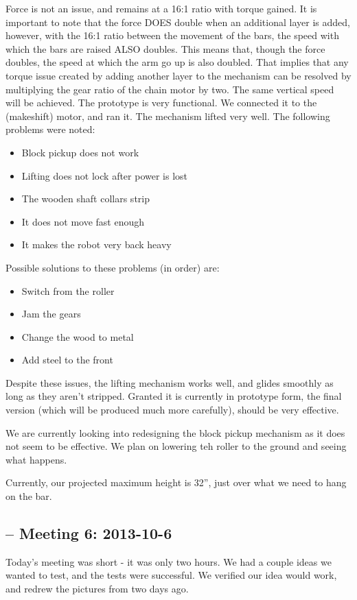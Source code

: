 Force is not an issue, and remains at a 16:1 ratio with torque gained. It is important to note that the force DOES double when an additional layer is added, however, with the 16:1 ratio between the movement of the bars, the speed with which the bars are raised ALSO doubles. This means that, though the force doubles, the speed at which the arm go up is also doubled. That implies that any torque issue created by adding another layer to the mechanism can be resolved by multiplying the gear ratio of the chain motor by two. The same vertical speed will be achieved.
The prototype is very functional. We connected it to the (makeshift) motor, and ran it. The mechanism lifted very well. The following problems were noted:
\begin{itemize}
\item Block pickup does not work
\item Lifting does not lock after power is lost
\item The wooden shaft collars strip
\item It does not move fast enough
\item It makes the robot very back heavy
\end{itemize}

Possible solutions to these problems (in order) are:
\begin{itemize}
\item Switch from the roller
\item Jam the gears
\item Change the wood to metal
\item Add steel to the front
\end{itemize}

Despite these issues, the lifting mechanism works well, and glides smoothly as long as they aren't stripped. Granted it is currently in prototype form, the final version (which will be produced much more carefully), should be very effective.

We are currently looking into redesigning the block pickup mechanism as it does not seem to be effective. We plan on lowering teh roller to the ground and seeing what happens. 

Currently, our projected maximum height is 32”, just over what we need to hang on the bar.

\newpage \subsection{ -- Meeting 6: 2013-10-6}
Today’s meeting was short - it was only two hours. We had a couple ideas we wanted to test, and the tests were successful. We verified our idea would work, and redrew the pictures from two days ago.

